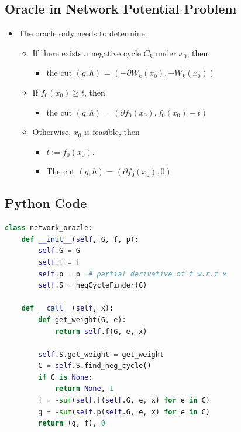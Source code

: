 \documentclass[]{article}
\providecommand{\tightlist}{%
  \setlength{\itemsep}{0pt}\setlength{\parskip}{0pt}}
\begin{document}
\hypertarget{oracle-in-network-potential-problem}{%
\subsection{Oracle in Network Potential
Problem}\label{oracle-in-network-potential-problem}}

\begin{itemize}
\tightlist
\item
  The oracle only needs to determine:

  \begin{itemize}
  \tightlist
  \item
    If there exists a negative cycle \(C_k\) under \(x_0\), then

    \begin{itemize}
    \tightlist
    \item
      the cut \((g, h)\) = \((-\partial W_k(x_0), -W_k(x_0))\)
    \end{itemize}
  \item
    If \(f_0(x_0) \geq t\), then

    \begin{itemize}
    \tightlist
    \item
      the cut \((g, h)\) = \((\partial f_0(x_0), f_0(x_0) - t)\)
    \end{itemize}
  \item
    Otherwise, \(x_0\) is feasible, then

    \begin{itemize}
    \tightlist
    \item
      \(t := f_0(x_0)\).
    \item
      The cut \((g, h)\) = \((\partial f_0(x_0), 0)\)
    \end{itemize}
  \end{itemize}
\end{itemize}

\hypertarget{python-code}{%
\subsection{Python Code}\label{python-code}}

\begin{lstlisting}[language=Python]
class network_oracle:
    def __init__(self, G, f, p):
        self.G = G
        self.f = f
        self.p = p  # partial derivative of f w.r.t x
        self.S = negCycleFinder(G)

    def __call__(self, x):
        def get_weight(G, e):
            return self.f(G, e, x)

        self.S.get_weight = get_weight
        C = self.S.find_neg_cycle()
        if C is None:
            return None, 1
        f = -sum(self.f(self.G, e, x) for e in C)
        g = -sum(self.p(self.G, e, x) for e in C)
        return (g, f), 0
\end{lstlisting}
\end{document}
